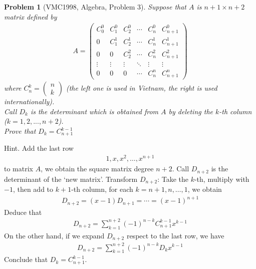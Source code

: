 \documentclass{article}
\newtheorem{problem}{Problem}
\begin{document}
\begin{problem}[VMC1998, Algebra, Problem 3]
	Suppose that $A$ is $n+1 \times n+2$ matrix defined by
	\begin{align}
		A = \left( {\begin{array}{*{20}{c}}
				{C_0^0}&{C_1^0}&{C_2^0}& \cdots &{C_n^0}&{C_{n + 1}^0}\\
				0&{C_1^1}&{C_2^1}& \cdots &{C_n^1}&{C_{n + 1}^1}\\
				0&0&{C_2^2}& \cdots &{C_n^2}&{C_{n + 1}^2}\\
				\vdots & \vdots & \vdots & \ddots & \vdots & \vdots \\
				0&0&0& \cdots &{C_n^n}&{C_{n + 1}^n}
		\end{array}} \right)
	\end{align}
	where $C_n^k = \left( {\begin{array}{*{20}{c}}
			n\\
			k
	\end{array}} \right)$ (the left one is used in Vietnam, the right is used internationally).\\
	Call $D_k$ is the determinant which is obtained from $A$ by deleting the $k$-th column ($k=1,2,...,n+2$).\\ Prove that ${D_k} = C_{n + 1}^{k - 1}$
\end{problem}
{\sf Hint.} Add the last row 
\begin{align}
	1,x,{x^2}, \ldots ,{x^{n + 1}}
\end{align}
to matrix $A$, we obtain the square matrix degree $n+2$. Call $D_{n+2}$ is the determinant of the \lq new matrix\rq. Transform $D_{n+2}$: Take the $k$-th, multiply with $-1$, then add to $k+1$-th column, for each $k = n + 1,n, \ldots ,1$, we obtain
\begin{align}
	{D_{n + 2}} = \left( {x - 1} \right){D_{n + 1}} =  \cdots  = {\left( {x - 1} \right)^{n + 1}}
\end{align}
Deduce that 
\begin{align}
	{D_{n + 2}} = \sum\limits_{k = 1}^{n + 2} {{{\left( { - 1} \right)}^{n - k}}C_{n + 1}^{k - 1}{x^{k - 1}}} 
\end{align}
On the other hand, if we expand $D_{n+2}$ respect to the last row, we have
\begin{align}
	{D_{n + 2}} = \sum\limits_{k = 1}^{n + 2} {{{\left( { - 1} \right)}^{n - k}}{D_k}{x^{k - 1}}}
\end{align}
Conclude that ${D_k} = C_{n + 1}^{k - 1}$.
\end{document}
